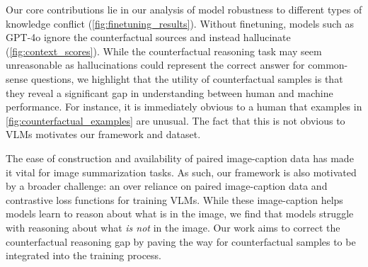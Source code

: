 
Our core contributions lie in our analysis of model robustness to different types of knowledge conflict (\autoref{fig:finetuning_results}). Without finetuning, models such as GPT-4o ignore the counterfactual sources and instead hallucinate (\autoref{fig:context_scores}). While the counterfactual reasoning task may seem unreasonable as hallucinations could represent the correct answer for common-sense questions, we highlight that the utility of counterfactual samples is that they reveal a significant gap in understanding between human and machine performance. For instance, it is immediately obvious to a human that examples in \autoref{fig:counterfactual_examples} are unusual. The fact that this is not obvious to VLMs motivates our framework and dataset.








The ease of construction and availability of paired image-caption data has made it vital for image summarization tasks. As such, our framework is also motivated by a broader challenge: an over reliance on paired image-caption data and contrastive loss functions for training VLMs. While these image-caption helps models learn to reason about what is in the image, we find that models struggle with reasoning about what \textit{is not} in the image. Our work aims to correct the counterfactual reasoning gap by paving the way for counterfactual samples to be integrated into the training process.

